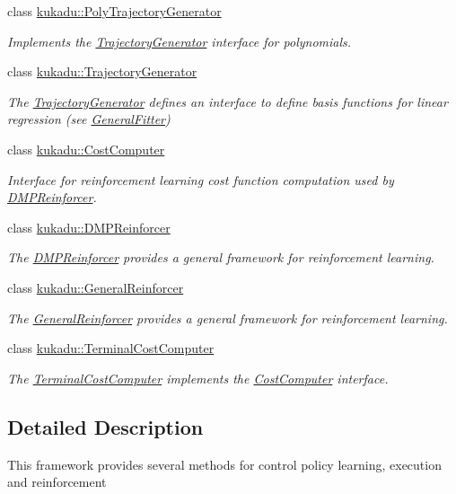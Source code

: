 \begin{DoxyCompactItemize}
class \hyperlink{classkukadu_1_1PolyTrajectoryGenerator}{kukadu\-::\-Poly\-Trajectory\-Generator}
\begin{DoxyCompactList}\small\item\em Implements the \hyperlink{classkukadu_1_1TrajectoryGenerator}{Trajectory\-Generator} interface for polynomials. \end{DoxyCompactList}\item 
class \hyperlink{classkukadu_1_1TrajectoryGenerator}{kukadu\-::\-Trajectory\-Generator}
\begin{DoxyCompactList}\small\item\em The \hyperlink{classkukadu_1_1TrajectoryGenerator}{Trajectory\-Generator} defines an interface to define basis functions for linear regression (see \hyperlink{classkukadu_1_1GeneralFitter}{General\-Fitter}) \end{DoxyCompactList}\item 
class \hyperlink{classkukadu_1_1CostComputer}{kukadu\-::\-Cost\-Computer}
\begin{DoxyCompactList}\small\item\em Interface for reinforcement learning cost function computation used by \hyperlink{classkukadu_1_1DMPReinforcer}{D\-M\-P\-Reinforcer}. \end{DoxyCompactList}\item 
class \hyperlink{classkukadu_1_1DMPReinforcer}{kukadu\-::\-D\-M\-P\-Reinforcer}
\begin{DoxyCompactList}\small\item\em The \hyperlink{classkukadu_1_1DMPReinforcer}{D\-M\-P\-Reinforcer} provides a general framework for reinforcement learning. \end{DoxyCompactList}\item 
class \hyperlink{classkukadu_1_1GeneralReinforcer}{kukadu\-::\-General\-Reinforcer}
\begin{DoxyCompactList}\small\item\em The \hyperlink{classkukadu_1_1GeneralReinforcer}{General\-Reinforcer} provides a general framework for reinforcement learning. \end{DoxyCompactList}\item 
class \hyperlink{classkukadu_1_1TerminalCostComputer}{kukadu\-::\-Terminal\-Cost\-Computer}
\begin{DoxyCompactList}\small\item\em The \hyperlink{classkukadu_1_1TerminalCostComputer}{Terminal\-Cost\-Computer} implements the \hyperlink{classkukadu_1_1CostComputer}{Cost\-Computer} interface. \end{DoxyCompactList}\end{DoxyCompactItemize}


\subsection{Detailed Description}
This framework provides several methods for control policy learning, execution and reinforcement 